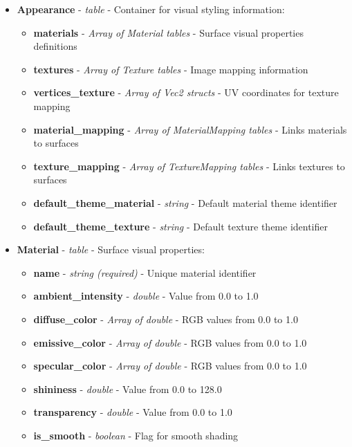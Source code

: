 \begin{itemize}
  \item \textbf{Appearance} - \textit{table} - Container for visual styling information:
    \begin{itemize}
      \item \textbf{materials} - \textit{Array of Material tables} - Surface visual properties definitions
      \item \textbf{textures} - \textit{Array of Texture tables} - Image mapping information
      \item \textbf{vertices\_texture} - \textit{Array of Vec2 structs} - UV coordinates for texture mapping
      \item \textbf{material\_mapping} - \textit{Array of MaterialMapping tables} - Links materials to surfaces
      \item \textbf{texture\_mapping} - \textit{Array of TextureMapping tables} - Links textures to surfaces
      \item \textbf{default\_theme\_material} - \textit{string} - Default material theme identifier
      \item \textbf{default\_theme\_texture} - \textit{string} - Default texture theme identifier
    \end{itemize}

  \item \textbf{Material} - \textit{table} - Surface visual properties:
    \begin{itemize}
      \item \textbf{name} - \textit{string (required)} - Unique material identifier
      \item \textbf{ambient\_intensity} - \textit{double} - Value from 0.0 to 1.0
      \item \textbf{diffuse\_color} - \textit{Array of double} - RGB values from 0.0 to 1.0
      \item \textbf{emissive\_color} - \textit{Array of double} - RGB values from 0.0 to 1.0
      \item \textbf{specular\_color} - \textit{Array of double} - RGB values from 0.0 to 1.0
      \item \textbf{shininess} - \textit{double} - Value from 0.0 to 128.0
      \item \textbf{transparency} - \textit{double} - Value from 0.0 to 1.0
      \item \textbf{is\_smooth} - \textit{boolean} - Flag for smooth shading
    \end{itemize}


\end{itemize}
